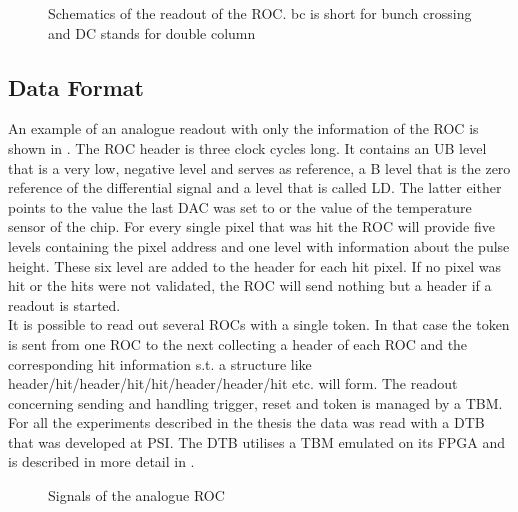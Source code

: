 \documentclass[british,11pt,a4paper]{memoir}
\begin{document}
\begin{figure}[ht]
	\centering
	\hfill
	\caption{Schematics of the readout of the \ac{ROC}. bc is short for bunch crossing and DC stands for double column}
	\label{pro}
\end{figure}\no
\subsection{Data Format}\label{sdata}
An example of an analogue readout with only the information of the \ac{ROC} is shown in . The \ac{ROC} header is three clock cycles long. It contains an \ac{UB} level that is a very low, negative level and serves as reference, a \ac{B} level that is the zero reference of the differential signal and a level that is called \ac{LD}. The latter either points to the value the last \ac{DAC} was set to or the value of the temperature sensor of the chip. For every single pixel that was hit the \ac{ROC} will provide five levels containing the pixel address and one level with information about the pulse height. These six level are added to the header for each hit pixel. If no pixel was hit or the hits were not validated, the \ac{ROC} will send nothing but a header if a readout is started.\\
It is possible to read out several \ac{ROC}s with a single token. In that case the token is sent from one \ac{ROC} to the next collecting a header of each \ac{ROC} and the corresponding hit information s.t. a structure like header/hit/header/hit/hit/header/header/hit etc. will form. The readout concerning sending and handling trigger, reset and token is managed by a \ac{TBM}. For all the experiments described in the thesis the data was read with a \ac{DTB} that was developed at \ac{PSI}. The \ac{DTB} utilises a \ac{TBM} emulated on its \ac{FPGA} and is described in more detail in .\\
\begin{figure}[ht]
	\centering
	\hfill
	\caption{Signals of the analogue \ac{ROC}}
	\label{procsig}
\end{figure}\no
\end{document}

